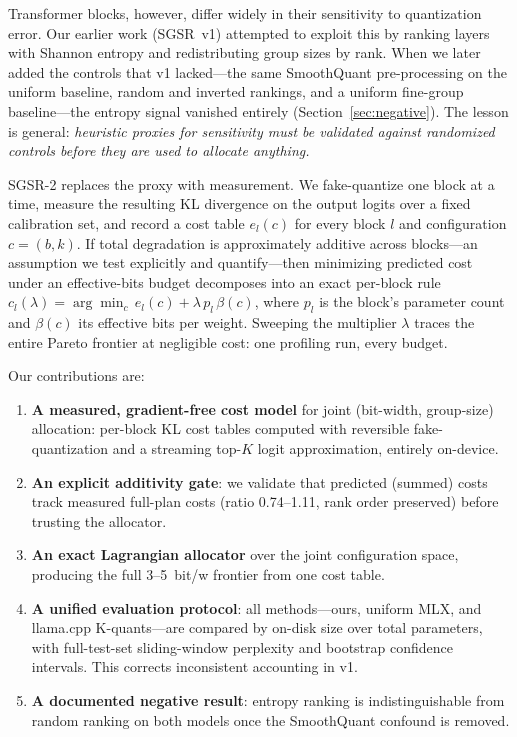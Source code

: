 \documentclass{article}
\begin{document}
Transformer blocks, however, differ widely in their sensitivity to
quantization error. Our earlier work (SGSR~v1) attempted to exploit this by
ranking layers with Shannon entropy and redistributing group sizes by rank.
When we later added the controls that v1 lacked---the same SmoothQuant
pre-processing on the uniform baseline, random and inverted rankings, and a
uniform fine-group baseline---the entropy signal vanished entirely
(Section~\ref{sec:negative}). The lesson is general: \emph{heuristic proxies
for sensitivity must be validated against randomized controls before they
are used to allocate anything.}

SGSR-2 replaces the proxy with measurement. We fake-quantize one block at a
time, measure the resulting KL divergence on the output logits over a fixed
calibration set, and record a cost table $e_l(c)$ for every block $l$ and
configuration $c=(b,k)$. If total degradation is approximately additive
across blocks---an assumption we test explicitly and quantify---then
minimizing predicted cost under an effective-bits budget decomposes into an
exact per-block rule $c_l(\lambda) = \arg\min_c\, e_l(c) + \lambda\,
p_l\,\beta(c)$, where $p_l$ is the block's parameter count and $\beta(c)$
its effective bits per weight. Sweeping the multiplier $\lambda$ traces the
entire Pareto frontier at negligible cost: one profiling run, every budget.

Our contributions are:
\begin{enumerate}
  \item \textbf{A measured, gradient-free cost model} for joint
    (bit-width, group-size) allocation: per-block KL cost tables computed
    with reversible fake-quantization and a streaming top-$K$ logit
    approximation, entirely on-device.
  \item \textbf{An explicit additivity gate}: we validate that predicted
    (summed) costs track measured full-plan costs (ratio 0.74--1.11, rank
    order preserved) before trusting the allocator.
  \item \textbf{An exact Lagrangian allocator} over the joint configuration
    space, producing the full 3--5~bit/w frontier from one cost table.
  \item \textbf{A unified evaluation protocol}: all methods---ours, uniform
    MLX, and llama.cpp K-quants---are compared by on-disk size over total
    parameters, with full-test-set sliding-window perplexity and bootstrap
    confidence intervals. This corrects inconsistent accounting in v1.
  \item \textbf{A documented negative result}: entropy ranking is
    indistinguishable from random ranking on both models once the
    SmoothQuant confound is removed.
\end{enumerate}
\end{document}
